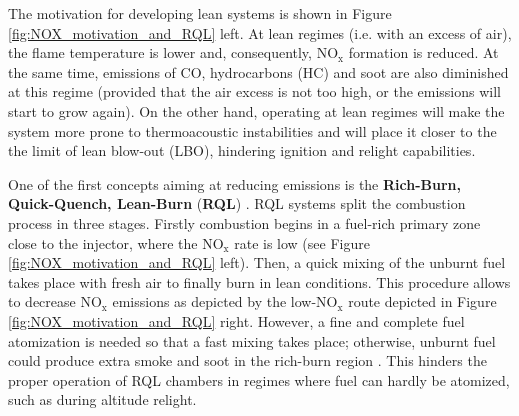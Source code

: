 

The motivation for developing lean systems is shown in Figure \ref{fig:NOX_motivation_and_RQL} left. At lean regimes (i.e. with an excess of air), the flame temperature is lower and, consequently, NO$_\mathrm{x}$ formation is reduced. At the same time, emissions of CO, hydrocarbons (HC) and soot are also diminished at this regime (provided that the air excess is not too high, or the emissions will start to grow again). On the other hand, operating at lean regimes will make the system more prone to thermoacoustic instabilities and will place it closer to the the limit of lean blow-out (LBO), hindering ignition and relight capabilities. 

One of the first concepts aiming at reducing emissions is the \textbf{Rich-Burn, Quick-Quench, Lean-Burn} (\textbf{RQL})  . RQL systems split the combustion process in three stages. Firstly combustion begins in a fuel-rich primary zone close to the injector, where the NO$_\mathrm{x}$ rate is low (see Figure \ref{fig:NOX_motivation_and_RQL} left). Then, a quick mixing of the unburnt fuel takes place with fresh air to finally burn in lean conditions. This procedure allows to decrease NO$_\mathrm{x}$ emissions as depicted by the low-NO$_\mathrm{x}$ route depicted in Figure \ref{fig:NOX_motivation_and_RQL} right. However, a fine and complete fuel atomization is needed so that a fast mixing takes place; otherwise, unburnt fuel could produce extra smoke and soot in the rich-burn region . This hinders the proper operation of RQL chambers in regimes where fuel can hardly be atomized, such as during altitude relight.

\newpage

